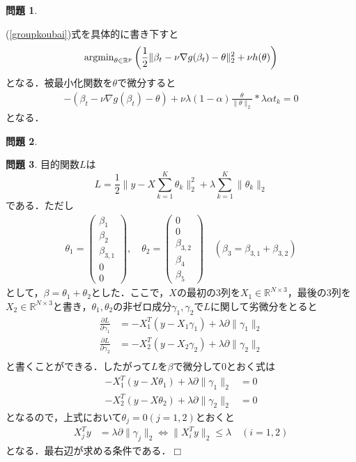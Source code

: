\documentclass[titlepage]{jsarticle}
\theoremstyle{definition}
\newtheorem{Ex}{問題}
\theoremstyle{mystyle} %
\def\qed{\hfill$\Box$}
\begin{document}
\begin{Ex}
\begin{enumerate}[(a)]
(\ref{groupkoubai})式を具体的に書き下すと
\begin{align*}
{\rm argmin}_{\theta\in\mathbb{R}^p}\left(\frac{1}{2}\|\beta_t - \nu \nabla g(\beta_t) - \theta\|_2^2 + \nu h(\theta)\right)
\end{align*}
となる．被最小化関数を$\theta$で微分すると
\begin{align*}
-(\beta_t - \nu \nabla g(\beta_t) - \theta) + \nu \lambda (1-\alpha)\frac{\theta}{\|\theta\|_2} * \lambda \alpha t_k = 0
\end{align*}
となる．

\end{enumerate}
\end{Ex}
\begin{Ex}

\end{Ex}
\begin{Ex}
目的関数$L$は
$$L=\frac{1}{2}\|y-X\sum_{k=1}^K\theta_k\|_2^2 +\lambda\sum_{k=1}^K\|\theta_k\|_2$$
である．ただし
\begin{align*}
  \theta_1=\left(\begin{array}{c}
    \beta_1\\
    \beta_2\\
    \beta_{3,1}\\
    0\\
    0
  \end{array}\right),\quad \theta_2=\left(\begin{array}{c}
    0\\
    0\\
    \beta_{3,2}\\
    \beta_4\\
    \beta_5
  \end{array}\right)\quad (\beta_3=\beta_{3,1}+\beta_{3,2})
\end{align*}
として，$\beta=\theta_1+\theta_2$とした．ここで，$X$の最初の3列を$X_1\in\mathbb{R}^{N\times 3}$，最後の3列を$X_2\in \mathbb{R}^{N\times 3}$と書き，$\theta_1,\theta_2$の非ゼロ成分$\gamma_1,\gamma_2$で$L$に関して劣微分をとると
\begin{align*}
  \frac{\partial L}{\partial \gamma_1}&=-X_1^T(y-X_1\gamma_1)+\lambda\partial\|\gamma_1\|_2\\
  \frac{\partial L}{\partial \gamma_2}&=-X_2^T(y-X_2\gamma_2)+\lambda\partial\|\gamma_2\|_2\\
\end{align*}
と書くことができる．したがって$L$を$\beta$で微分して$0$とおく式は
\begin{align*}
  -X_1^T(y-X\theta_1)+\lambda\partial\|\gamma_1\|_2&=0\\
  -X_2^T(y-X\theta_2)+\lambda\partial\|\gamma_2\|_2&=0
\end{align*}
となるので，上式において$\theta_j=0(j=1,2)$とおくと
\begin{align*}
  X_j^Ty &=\lambda\partial\|\gamma_j\|_2\Leftrightarrow \|X_i^Ty\|_2\leq \lambda\quad(i=1,2)
\end{align*}
となる．最右辺が求める条件である．\qed\\
\end{Ex}
\end{document}
